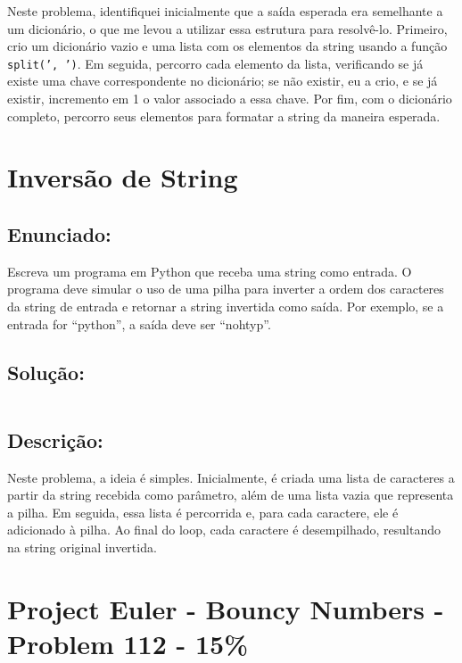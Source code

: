\documentclass[9pt,a4paper,twocolumn,twoside]{tau-class/tau}
\begin{document}
        Neste problema, identifiquei inicialmente que a saída esperada era semelhante a um dicionário, o que me levou a utilizar essa estrutura para resolvê-lo. Primeiro, crio um dicionário vazio e uma lista com os elementos da string usando a função \texttt{split(', ')}. Em seguida, percorro cada elemento da lista, verificando se já existe uma chave correspondente no dicionário; se não existir, eu a crio, e se já existir, incremento em 1 o valor associado a essa chave. Por fim, com o dicionário completo, percorro seus elementos para formatar a string da maneira esperada.
	
\section{Inversão de String}

    \subsection{Enunciado:}
	
        \begin{tauenv}[frametitle = Inversão de string.]
                Escreva um programa em Python que receba uma string como entrada. O programa deve simular o
                uso de uma pilha para inverter a ordem dos caracteres da string de entrada e retornar a string invertida como saída. Por exemplo, se a entrada for ``python'', a saída deve ser ``nohtyp''.
        \end{tauenv}

    \subsection{Solução:}

        \inputminted{python}{src/10/10.py}

    \subsection{Descrição:}

        Neste problema, a ideia é simples. Inicialmente, é criada uma lista de caracteres a partir da string recebida como parâmetro, além de uma lista vazia que representa a pilha. Em seguida, essa lista é percorrida e, para cada caractere, ele é adicionado à pilha. Ao final do loop, cada caractere é desempilhado, resultando na string original invertida.
	
\section{Project Euler - Bouncy Numbers - Problem 112 - 15\%}
\end{document}
